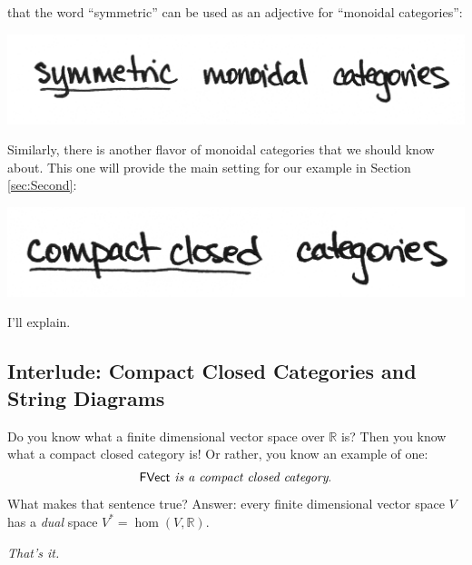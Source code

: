 \documentclass{tufte-handout-tai}
\newcommand{\cat}[1]{{\normalfont\textsf{#1}}}
\theoremstyle{plain}
\theoremstyle{definition}
\theoremstyle{remark}
\begin{document}
 that the word ``symmetric'' can be used as an adjective for ``monoidal categories'':
\begin{center}
\includegraphics[width=!,totalheight=!,scale=0.5]{SMCs.png}
\end{center}
Similarly, there is another flavor of monoidal categories that we should know about. This one will provide the main setting for our example in Section \ref{sec:Second}:
\begin{center}
\includegraphics[width=!,totalheight=!,scale=0.5]{CCCs.png}
\end{center}
I'll explain.

\subsection*{Interlude: Compact Closed Categories and String Diagrams}
Do you know what a finite dimensional vector space over $\mathbb{R}$ is? Then you know what a compact closed category is! Or rather, you know an example of one: 
\[\cat{FVect} \textit{ is a compact closed category}.\]
What makes that sentence true? Answer: every finite dimensional vector space $V$ has a \textit{dual} space $V^*=\hom(V,\mathbb{R})$.

\vspace{0.5cm}
\noindent \textit{That's it.} 
\vspace{0.5cm}
\end{document}
